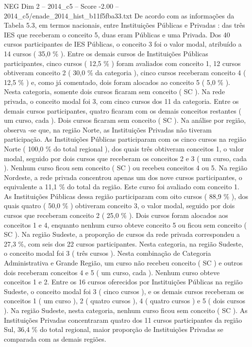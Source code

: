 \begin{textsample}{NEG Dim 2 – 2014\_c5 – Score -2.00 – 2014\_c5/enade\_2014\_hist\_b11f5fba33.txt}
De acordo com as informações da Tabela 5.3, em termos nacionais, entre Instituições Públicas e Privadas : das três IES que receberam o conceito 5, duas eram Públicas e uma Privada.
Dos 40 cursos participantes de IES Públicas, o conceito 3 foi o valor modal, atribuído a 14 cursos ( 35,0 \% ).
Entre os demais cursos de Instituições Públicas participantes, cinco cursos ( 12,5 \% ) foram avaliados com conceito 1, 12 cursos obtiveram conceito 2 ( 30,0 \% da categoria ), cinco cursos receberam conceito 4 ( 12,5 \% ) e, como já comentado, dois foram alocados ao conceito 5 ( 5,0 \% ).
Nesta categoria, somente dois cursos ficaram sem conceito ( SC ).
Na rede privada, o conceito modal foi 3, com cinco cursos dos 11 da categoria.
Entre os demais cursos participantes, quatro ficaram com os demais conceitos restantes ( um curso, cada ).
Dois cursos ficaram sem conceito ( SC ).
Na análise por região, observa -se que, na região Norte, as Instituições Privadas não tiveram participação.
As Instituições Públicas participaram com os cinco cursos na região Norte ( 100,0 \% do total regional ), dos quais três obtiveram conceitos 1, o valor modal, seguido por dois cursos que receberam os conceitos 2 e 3 ( um curso, cada ).
Nenhum curso ficou sem conceito ( SC ) ou recebeu conceitos 4 ou 5.
Na região Nordeste, a rede privada concentrou apenas um dos nove cursos participantes, o equivalente a 11,1 \% do total da região.
Este curso foi avaliado com conceito 1.
As Instituições Públicas dessa região participaram com oito cursos ( 88,9 \% ), dos quais quatro ( 50,0 \% ) obtiveram conceito 3, o valor modal, seguido por dois cursos que receberam conceito 2 ( 25,0 \% ).
Dois cursos foram alocados aos conceitos 1 e 4, enquanto nenhum curso obteve conceito 5 ou ficou sem conceito ( SC ).
Na região Sudeste, a proporção de cursos da rede privada correspondeu a 27,3 \%, com seis dos 22 cursos participantes.
Nesta categoria, na região Sudeste, o conceito modal foi 3 ( três cursos ).
Nesta combinação de Categoria Administrativa e Grande Região, um curso não recebeu conceito ( SC ) e outros dois receberam conceitos 4 e 5 ( um curso, cada ).
Nenhum curso obteve conceitos 1 e 2.
Entre os 16 cursos oferecidos por Instituições Públicas na região Sudeste, o conceito modal foi 3 ( cinco cursos ), e os demais cursos receberam os conceitos 1 ( um curso ), 2 ( quatro cursos ), 4 ( quatro cursos ) e 5 ( dois cursos ).
Na região Sudeste, nesta categoria, nenhum curso ficou sem conceito ( SC ).
As Instituições Privadas concentraram quatro dos 11 cursos participantes da região Sul, 36,4 \% do total regional, maior proporção de Instituições Privadas se comparada com as demais regiões.

\end{textsample}
